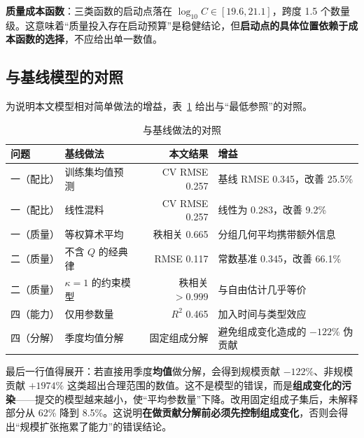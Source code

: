 \textbf{质量成本函数}：三类函数的启动点落在 $\log_{10}C\in[19.6,21.1]$，跨度 1.5 个数量级。这意味着``质量投入存在启动预算''是稳健结论，但\textbf{启动点的具体位置依赖于成本函数的选择}，不应给出单一数值。

\subsection{与基线模型的对照}

为说明本文模型相对简单做法的增益，表~\ref{tab:baseline} 给出与``最低参照''的对照。

\begin{table}[htbp]
\centering
\caption{与基线做法的对照}
\label{tab:baseline}
\small
\begin{tabular}{l|l|r|l}
\toprule
\textbf{问题} & \textbf{基线做法} & \textbf{本文结果} & \textbf{增益} \\
\midrule
一（配比） & 训练集均值预测 & CV RMSE 0.257 & 基线 RMSE 0.345，改善 25.5\% \\
一（配比） & 线性混料 & CV RMSE 0.257 & 线性为 0.283，改善 9.2\% \\
一（质量） & 等权算术平均 & 秩相关 0.665 & 分组几何平均携带额外信息 \\
二（质量） & 不含 $Q$ 的经典律 & RMSE 0.117 & 常数基准 0.345，改善 66.1\% \\
二（质量） & $\kappa=1$ 的约束模型 & 秩相关 $>0.999$ & 与自由估计几乎等价 \\
四（能力） & 仅用参数量 & $R^2$ 0.465 & 加入时间与类型效应 \\
四（分解） & 季度均值分解 & 固定组成分解 & 避免组成变化造成的 $-122\%$ 伪贡献 \\
\bottomrule
\end{tabular}
\end{table}

最后一行值得展开：若直接用季度\textbf{均值}做分解，会得到规模贡献 $-122\%$、非规模贡献 $+1974\%$ 这类超出合理范围的数值。这不是模型的错误，而是\textbf{组成变化的污染}——提交的模型越来越小，使``平均参数量''下降。改用固定组成子集后，未解释部分从 62\% 降到 8.5\%。这说明\textbf{在做贡献分解前必须先控制组成变化}，否则会得出``规模扩张拖累了能力''的错误结论。
